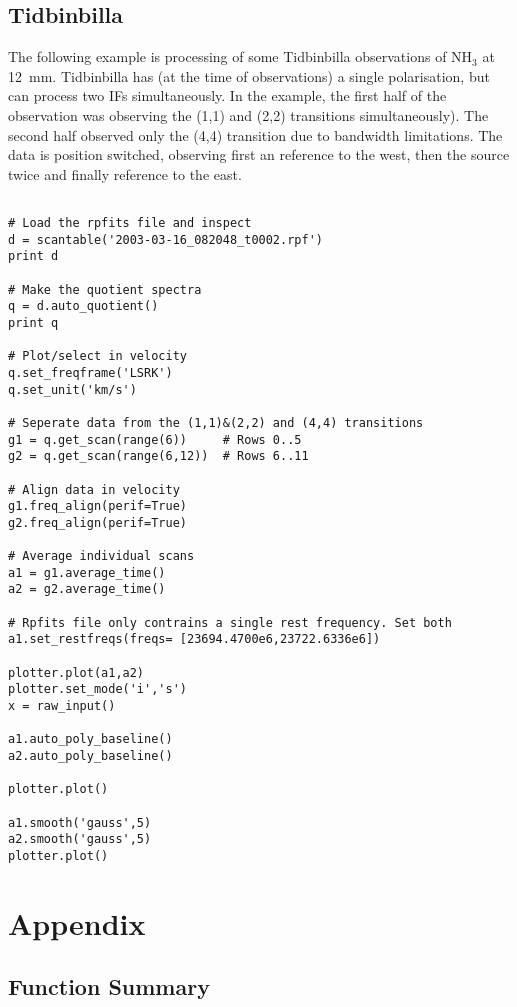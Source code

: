 \documentclass[11pt]{article}
\begin{document}
\subsection{Tidbinbilla}

The following example is processing of some
Tidbinbilla observations of NH$_3$ at 12~mm. Tidbinbilla has (at the
time of observations) a single polarisation, but can process two IFs
simultaneously. In the example, the first half of the observation was
observing the (1,1) and (2,2) transitions simultaneously). The second
half observed only the (4,4) transition due to bandwidth
limitations. The data is position switched, observing first an
reference to the west, then the source twice and finally reference to
the east.

\begin{verbatim}

# Load the rpfits file and inspect
d = scantable('2003-03-16_082048_t0002.rpf')
print d

# Make the quotient spectra
q = d.auto_quotient()
print q

# Plot/select in velocity
q.set_freqframe('LSRK')
q.set_unit('km/s')

# Seperate data from the (1,1)&(2,2) and (4,4) transitions
g1 = q.get_scan(range(6))     # Rows 0..5
g2 = q.get_scan(range(6,12))  # Rows 6..11

# Align data in velocity
g1.freq_align(perif=True)
g2.freq_align(perif=True)

# Average individual scans
a1 = g1.average_time()
a2 = g2.average_time()

# Rpfits file only contrains a single rest frequency. Set both
a1.set_restfreqs(freqs= [23694.4700e6,23722.6336e6])

plotter.plot(a1,a2)
plotter.set_mode('i','s')
x = raw_input()

a1.auto_poly_baseline()
a2.auto_poly_baseline()

plotter.plot()

a1.smooth('gauss',5)
a2.smooth('gauss',5)
plotter.plot()

\end{verbatim}

\newpage

\section{Appendix}

\subsection{Function Summary}
\end{document}
